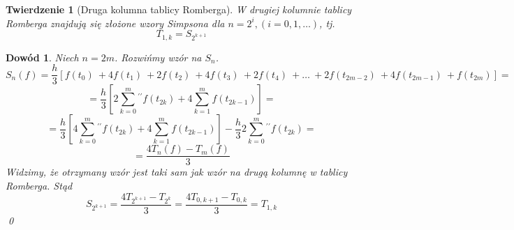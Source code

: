 \documentclass{article}
\newtheorem{twr}{Twierdzenie}
\newtheorem*{dd}{Dowód}
\begin{document}
\begin{twr}[Druga kolumna tablicy Romberga]
	W drugiej kolumnie tablicy Romberga znajdują się złożone wzory Simpsona dla $n = 2^i, (i = 0, 1, \ldots)$, tj.
	\begin{equation*}
		T_{1, k} = S_{2^{k+1}}
	\end{equation*}
\end{twr}
\begin{dd}
	\normalfont
	Niech $n = 2m$. Rozwińmy wzór na $S_n$.
	\begin{equation*}
		S_n(f) = \frac{h}{3}[f(t_0)\ + 4 f(t_1)\ + 2f(t_2)\ + 4f(t_3)\ + 2f(t_4)\ + \ldots\ + 2f(t_{2m - 2})\ + 4f(t_{2m - 1})\ + f(t_{2m})] =
	\end{equation*}
	\begin{equation*}
		= \frac{h}{3}[2 \sum_{k = 0}^m {}^{\prime\prime} f(t_{2k}) + 4 \sum_{k = 1}^m f(t_{2k - 1})] =
	\end{equation*}
	\begin{equation*}
		= \frac{h}{3}[4 \sum_{k = 0}^m {}^{\prime\prime} f(t_{2k}) + 4 \sum_{k = 1}^m f(t_{2k - 1})] - \frac{h}{3} 2 \sum_{k = 0}^m {}^{\prime\prime} f(t_{2k}) =
	\end{equation*}
	\begin{equation*}
		= \frac{4 T_n(f) - T_m(f)}{3}
	\end{equation*}
	Widzimy, że otrzymany wzór jest taki sam jak wzór na drugą kolumnę w tablicy Romberga. Stąd
	\begin{equation*}
		S_{2^{k+1}} = \frac{4T_{2^{k+1}} - T_{2^k}}{3} = \frac{4T_{0,k+1} - T_{0,k}}{3} = T_{1,k}
	\end{equation*}
	\qed
\end{dd}
\end{document}
